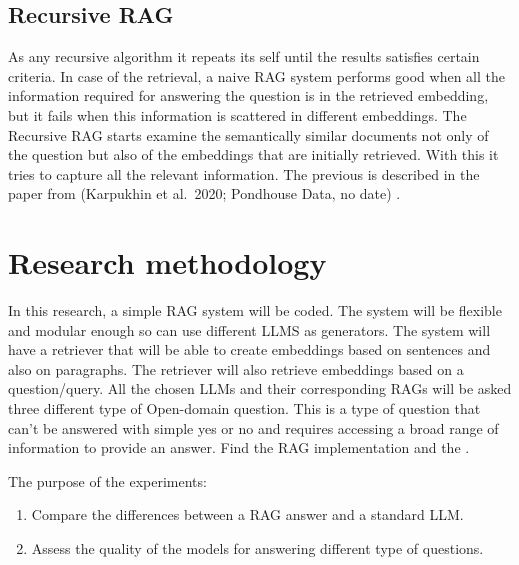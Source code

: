 \documentclass{wseas}
\begin{document}
\subsection{Recursive RAG}

As any recursive algorithm it repeats its self until the results
satisfies certain criteria. In case of the retrieval, a naive RAG system
performs good when all the information required for answering the
question is in the retrieved embedding, but it fails when this
information is scattered in different embeddings. The Recursive RAG
starts examine the semantically similar documents not only of the
question but also of the embeddings that are initially retrieved. With
this it tries to capture all the relevant information. The previous is
described in the paper from (Karpukhin et al.~2020; Pondhouse Data, no
date) \cite{website_PondhouseGuideOnAdvancedRAG} .


\section{Research methodology}

In this research, a simple RAG system will be coded. The system will be
flexible and modular enough so can use different LLMS as generators. The
system will have a retriever that will be able to create embeddings
based on sentences and also on paragraphs. The retriever will also
retrieve embeddings based on a question/query. All the chosen LLMs and
their corresponding RAGs will be asked three different type of Open-domain
question. This is a type of question that can't be answered with simple
yes or no and requires accessing a broad range of information to provide
an answer. Find the RAG implementation and the \cite{cite_github_solution}.

The purpose of the experiments: 
\begin{enumerate}
  \item Compare the differences between a RAG answer and a standard LLM.
  \item Assess the quality of the models for answering different type of questions.
\end{enumerate}
\end{document}
